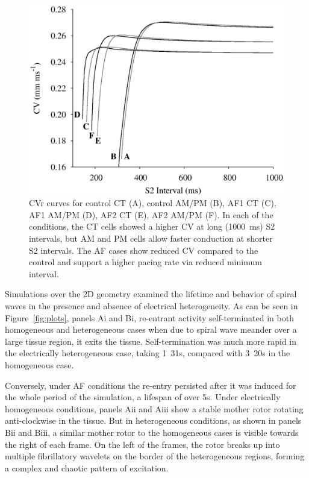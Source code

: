 \begin{figure}[tb]
\centering
\includegraphics{figures/toolkit/afer/4_cvr}
\caption[AFER CVr curves]{CVr curves for control CT (A), control AM/PM (B), AF1 CT (C),
AF1 AM/PM (D), AF2 CT (E), AF2 AM/PM (F).  In each of the conditions,
the CT cells showed a higher CV at long (1000~ms) S2 intervals, but AM
and PM cells allow faster conduction at shorter S2 intervals.  The AF
cases show reduced CV compared to the control and support a higher
pacing rate via reduced minimum interval.}
\label{fig:cvr}
\end{figure}

Simulations over the 2D geometry examined the lifetime and behavior of
spiral waves in the presence and absence of electrical heterogeneity.
As can be seen in Figure~\ref{fig:plots}, panels Ai and Bi, re-entrant
activity self-terminated in both homogeneous and heterogeneous cases
when due to spiral wave meander over a large tissue region, it
exits the tissue.  Self-termination was much more rapid in the
electrically heterogeneous case, taking \unit{1.31}{s}, compared with
\unit{3.20}{s} in
the homogeneous case.

Conversely, under AF conditions the re-entry persisted after it was
induced for the whole period of the simulation, a lifespan of over \unit{5}{s}.
Under electrically homogeneous conditions, panels Aii and Aiii show a
stable mother rotor rotating anti-clockwise in the tissue.  But in
heterogeneous conditions, as shown in panels Bii and Biii, a similar
mother rotor to the homogeneous cases is visible towards the right of
each frame.  On the left of the frames, the rotor breaks up into
multiple fibrillatory wavelets on the border of the heterogeneous
regions, forming a complex and chaotic pattern of excitation.

